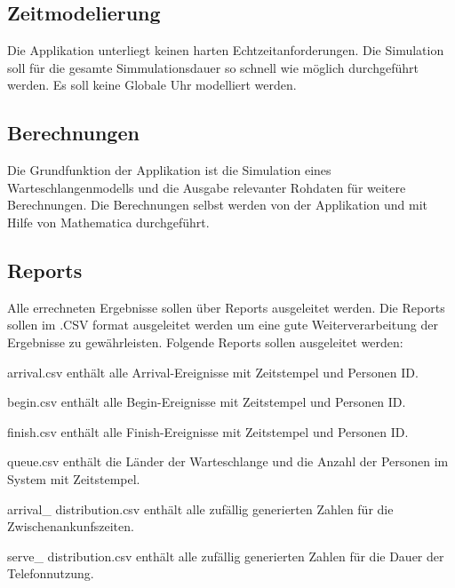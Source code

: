 \subsection{Zeitmodelierung}
Die Applikation unterliegt keinen harten Echtzeitanforderungen. Die Simulation soll für die gesamte Simmulationsdauer so schnell wie möglich durchgeführt werden. Es soll keine Globale Uhr modelliert werden.

\subsection{Berechnungen}
Die Grundfunktion der Applikation ist die Simulation eines Warteschlangenmodells und die Ausgabe relevanter Rohdaten für weitere Berechnungen. Die Berechnungen selbst werden von der Applikation und mit Hilfe von Mathematica durchgeführt.

\subsection{Reports}
Alle errechneten Ergebnisse sollen über Reports ausgeleitet werden. Die Reports sollen im .CSV format ausgeleitet werden um eine gute Weiterverarbeitung der Ergebnisse zu gewährleisten. Folgende Reports sollen ausgeleitet werden:
\begin{list}{•}
	\item arrival.csv enthält alle Arrival-Ereignisse mit Zeitstempel und Personen ID.
	\item begin.csv  enthält alle Begin-Ereignisse mit Zeitstempel und Personen ID.
	\item finish.csv  enthält alle Finish-Ereignisse mit Zeitstempel und Personen ID.
	\item queue.csv enthält die Länder der Warteschlange und die Anzahl der Personen im System mit Zeitstempel.
	\item arrival\_ distribution.csv enthält alle zufällig generierten Zahlen für die Zwischenankunfszeiten.
	\item serve\_ distribution.csv enthält alle zufällig generierten Zahlen für die Dauer der Telefonnutzung.
\end{list}
